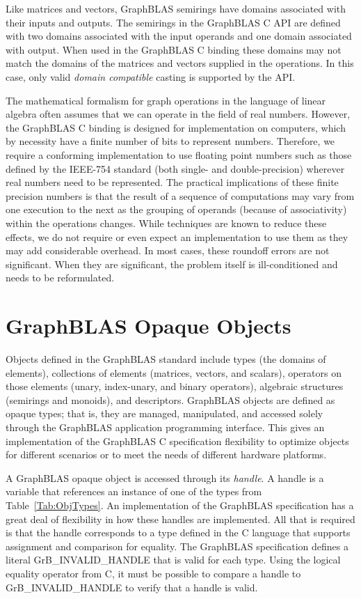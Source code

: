 {\color{red} Like matrices and vectors, GraphBLAS semirings have domains
associated with their inputs and outputs.  The semirings in the 
GraphBLAS C API are defined with two domains associated with the input operands and one 
domain associated with output.  When used in the GraphBLAS C binding these
domains may not match the domains of the matrices and vectors supplied in
the operations.  In this case, only valid \emph{domain compatible} casting 
is supported by the API.}

The mathematical formalism for graph operations in the language of 
linear algebra often assumes that we can operate in the field of real numbers. 
However, the GraphBLAS C binding is designed for implementation on computers, 
which by necessity have a finite number of bits to represent numbers. 
Therefore, we require a conforming implementation to use floating point 
numbers such as those defined by the IEEE-754 standard (both single- and double-precision) 
wherever real numbers need to be represented. The practical implications of 
these finite precision numbers is that the result of a sequence of 
computations may vary from one execution to the next as the grouping of operands
(because of associativity) within the operations changes.  While techniques are known to 
reduce these effects, we do not require or even expect an implementation 
to use them as they may add considerable overhead. In most 
cases, these roundoff errors are not significant. When they are significant, 
the problem itself is ill-conditioned and needs to be reformulated.


\section{GraphBLAS Opaque Objects}

Objects defined in the GraphBLAS standard include types (the domains of 
elements), collections of elements (matrices, vectors, and scalars), operators 
on those elements (unary, index-unary, and binary operators), algebraic 
structures (semirings and monoids), and descriptors.   GraphBLAS objects are 
defined as opaque types; that is, they are managed, manipulated, and accessed 
solely through the GraphBLAS application programming interface. This gives an 
implementation of the GraphBLAS C specification flexibility to optimize objects 
for different scenarios or to meet the needs of different hardware platforms.

A GraphBLAS opaque object is accessed through its \emph{handle}.  A handle is 
a variable that references an instance of one of the types from 
Table~\ref{Tab:ObjTypes}.  An implementation of the GraphBLAS specification 
has a great deal of flexibility in how these handles are implemented.  All 
that is required is that the handle corresponds to a type defined in the 
C language that supports assignment and comparison for equality.  The
GraphBLAS specification defines a literal {\sf GrB\_INVALID\_HANDLE} that is 
valid for each type.  Using the logical equality operator from C, it must be 
possible to compare a handle to {\sf GrB\_INVALID\_HANDLE} to verify that a 
handle is valid.


